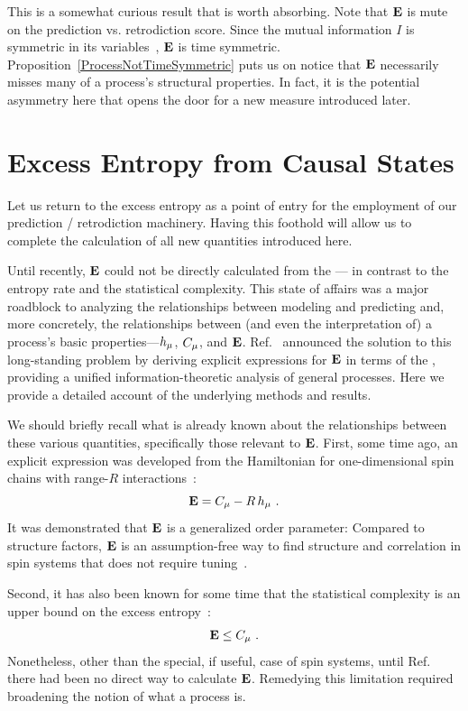 This is a somewhat curious result that is worth absorbing. Note that ${\bf E}$ is mute on the prediction vs. retrodiction score. Since the mutual information $I$ is
symmetric in its variables~\cite{Cove06a}, ${\bf E}$ is time symmetric.
Proposition~\ref{ProcessNotTimeSymmetric} puts us on notice that ${\bf E}$
necessarily misses many of a process's structural properties. In fact, it is the potential asymmetry here that opens the door for a new measure introduced later.

\section{Excess Entropy from Causal States}

Let us return to the excess entropy as a point of entry for the employment of our prediction / retrodiction machinery. Having this foothold will allow us to complete the calculation of all new quantities introduced here.

Until recently, ${\bf E}$ could not be directly calculated from the \eM---
in contrast to the entropy rate and the statistical complexity. This state of affairs 
was a major roadblock to analyzing the relationships between modeling
and predicting and, more concretely, the relationships between (and even the
interpretation of) a process's basic properties---$h_\mu$, $C_\mu$, and ${\bf E}$.
Ref.~\cite{Crut08a} announced the solution to this long-standing problem by 
deriving explicit expressions for ${\bf E}$ in terms of the \eM, providing a 
unified information-theoretic analysis of general processes. Here we
provide a detailed account of the underlying methods and results.

We should briefly recall what is already known about the relationships
between these various quantities, specifically those relevant to ${\bf E}$.
First, some time ago, an explicit expression was developed from the Hamiltonian
for one-dimensional spin chains with range-$R$ interactions~\cite{Crut97a}:
\begin{equation}
{\bf E} = C_\mu - R \, h_\mu ~.
\label{SpinEEandCmu}
\end{equation}
It was demonstrated that ${\bf E}$ is a generalized order parameter: Compared to
structure factors, ${\bf E}$ is an assumption-free way to find structure and
correlation in spin systems that does not require tuning~\cite{Feld98b}.

Second, it has also been known for some time that the statistical complexity
is an upper bound on the excess entropy~\cite{Shal98a}:
\begin{equation}
{\bf E} \leq C_\mu ~.
\label{CmuEBound}
\end{equation}
Nonetheless, other than the special, if useful, case of spin systems, until
Ref.~\cite{Crut08a} there had been no direct way to calculate ${\bf E}$. Remedying
this limitation required broadening the notion of what a process is.


